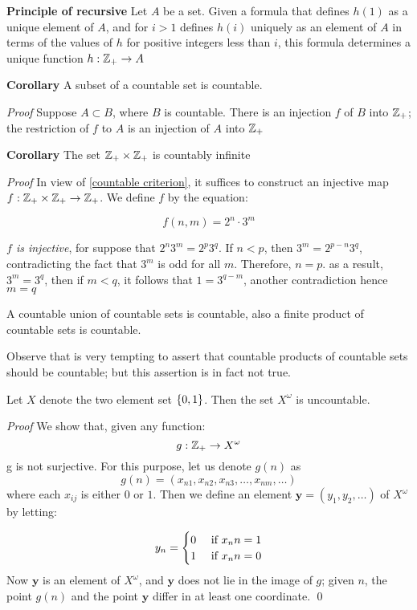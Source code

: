 \textbf{Principle of recursive} Let $A$ be a set. Given a formula that defines $ h(1) $ as a unique element of $A$, and for $ i > 1 $ defines $ h(i) $ uniquely as an element of $A$ in terms of the values of $h$ for positive integers less than $i$, this formula determines a unique function $ h : \mathbb{Z}_+ \rightarrow A $

\textbf{Corollary } A subset of a countable set is countable.

\textit{Proof} Suppose $A \subset B$, where $B$ is countable. There is an injection $f$ of $B$ into $ \mathbb{Z}_+ $; the restriction of $f$ to $A$ is an injection of $A$ into $ \mathbb{Z}
_+ $

\textbf{Corollary } The set $ \mathbb{Z}_+ \times \mathbb{Z}_+ $ is countably infinite

\textit{Proof} In view of \ref{countable criterion}, it suffices to construct an injective map $ f : \mathbb{Z}_+ \times \mathbb{Z}_+ \rightarrow \mathbb{Z}_+ $. We define $f$ by the equation:

\[ f(n,m) = 2^n\cdot 3^m \]

\emph{$f$ is injective}, for suppose that $ 2^n3^m = 2^p3^q $. If $ n<p $, then $ 3^m = 2^{p-n}3^q $,  contradicting the fact that $ 3^m $ is odd for all $ m $. Therefore, $ n = p $. as a result, $ 3^m = 3^q $, then if $ m < q $, it follows that $ 1 = 3^{q-m} $, another contradiction hence $ m = q $

\begin{thm}
	A countable union of countable sets is countable, also a finite product of countable sets is countable.
\end{thm}

Observe that is very tempting to assert that countable products of countable sets should be countable; but this assertion is in fact not true.

\begin{thm}
	Let $ X $ denote the two element set $ \left\lbrace 0,1 \right\rbrace $. Then the set $ X^{\omega} $ is uncountable.
\end{thm}

\textit{Proof} We show that, given any function:
\[ g: \mathbb{Z}_+ \rightarrow X^\omega \]
g is not surjective. For this purpose, let us denote $ g(n) $ as
\[ g(n) = (x_{n1},x_{n2},x_{n3}, \ldots, x_{nm}, \ldots) \]
where each $ x_{ij} $ is either $ 0 $ or $ 1 $. Then we define an element $ \textbf{y} = (y_1,y_2, \ldots) $ of $ X^\omega $ by letting:

\[ y_n = \begin{cases}
0 &\textrm{ if } x_nn =1\\
1 &\textrm{ if } x_nn =0\\
\end{cases} \]
Now $ \textbf{y} $ is an element of $ X^\omega $, and $ \textbf{y} $ does not lie in the image of $ g $; given $ n $, the point $ g(n) $ and the point $ \textbf{y} $ differ in at least one coordinate. \qed


